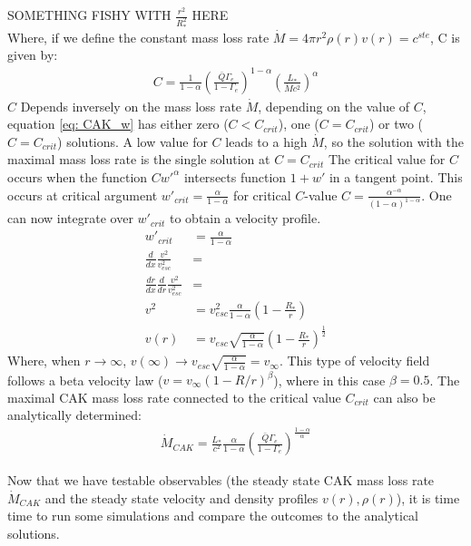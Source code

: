 SOMETHING FISHY WITH $\frac{r^2}{R_*^2}$ HERE\\

Where, if we define the constant mass loss rate $\dot{M} = 4\pi r^2 \rho(r) v(r) = c^{ste}$, C is given by:
\begin{align}
C = \frac{1}{1-\alpha} \left(\frac{\bar{Q}\Gamma_e}{1-\Gamma_e} \right)^{1-\alpha} \left(\frac{L_*}{\dot{M}c^2}\right)^\alpha
\end{align}
$C$ Depends inversely on the mass loss rate $\dot{M}$, depending on the value of $C$, equation \ref{eq: CAK_w} has either zero ($C < C_{crit}$), one ($C = C_{crit}$) or two ($C = C_{crit}$) solutions. A low value for $C$ leads to a high $\dot{M}$, so the solution with the maximal mass loss rate is the single solution at $C = C_{crit}$ The critical value for $C$ occurs when the function $C w'^\alpha$ intersects function $1 + w'$ in a tangent point. This occurs at critical argument $w'_{crit} = \frac{\alpha}{1-\alpha}$ for critical $C$-value $C = \frac{\alpha^{-\alpha}}{(1-\alpha)^{1-\alpha}}$. One can now integrate over $w'_{crit}$ to obtain a velocity profile.
\begin{align}
w'_{crit} &= \frac{\alpha}{1-\alpha} \\
\frac{d}{dx} \frac{v^2}{v_{esc}^2} &= \\
\frac{dr}{dx} \frac{d}{dr} \frac{v^2}{v_{esc}^2} &= \\
v^2 &= v_{esc}^2 \frac{\alpha}{1-\alpha} \left(1 - \frac{R_*}{r} \right) \\
v(r) &= v_{esc} \sqrt{\frac{\alpha}{1-\alpha}} \left(1 - \frac{R_*}{r} \right)^\frac{1}{2}
\end{align}
Where, when $r\rightarrow\infty$, $v(\infty) \rightarrow v_{esc} \sqrt{\frac{\alpha}{1-\alpha}} = v_\infty$. This type of velocity field follows a beta velocity law ($v = v_\infty (1-R/r)^\beta$), where in this case $\beta = 0.5$. The maximal CAK mass loss rate connected to the critical value $C_{crit}$ can also be analytically determined:
\begin{align}
\dot{M}_{CAK} = \frac{L_*}{c^2} \frac{\alpha}{1-\alpha}\left(\frac{\bar{Q}\Gamma_e}{1-\Gamma_e}\right)^{\frac{1-\alpha}{\alpha}}
\end{align}

Now that we have testable observables (the steady state CAK mass loss rate $\dot{M}_{CAK}$ and the steady state velocity and density profiles $v(r), \rho(r)$), it is time time to run some simulations and compare the outcomes to the analytical solutions.\\

